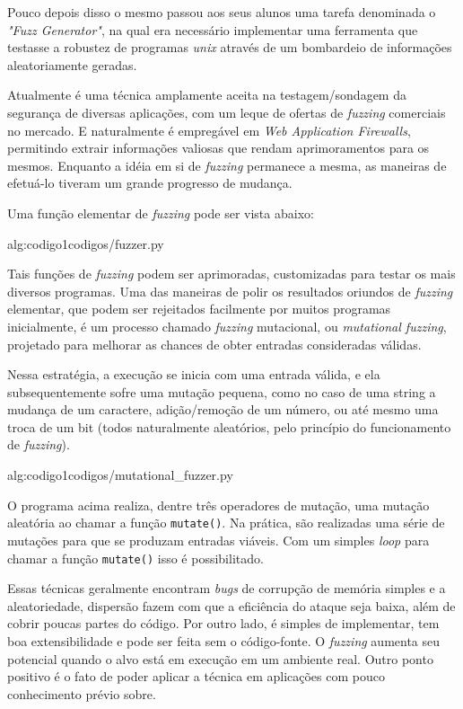 Pouco depois disso o mesmo passou aos seus alunos uma tarefa denominada o \textit{"Fuzz Generator"}, na qual era necessário implementar uma ferramenta que testasse a robustez de programas \textit{unix} através de um bombardeio de informações aleatoriamente geradas.

Atualmente é uma técnica amplamente aceita na testagem/sondagem da segurança de diversas aplicações, com um leque de ofertas de \textit{fuzzing} comerciais no mercado. E naturalmente é empregável em \textit{Web Application Firewalls}, permitindo extrair informações valiosas que rendam aprimoramentos para os mesmos. Enquanto a idéia em si de \textit{fuzzing} permanece a mesma, as maneiras de efetuá-lo tiveram um grande progresso de mudança.


Uma função elementar de \textit{fuzzing} pode ser vista abaixo:

 {alg:codigo1}{codigos/fuzzer.py}

\bigskip
Tais funções de \textit{fuzzing} podem ser aprimoradas, customizadas para testar os mais diversos programas. Uma das maneiras de polir os resultados oriundos de \textit{fuzzing} elementar, que podem ser rejeitados facilmente por muitos programas inicialmente, é um processo chamado \textit{fuzzing} mutacional, ou \textit{mutational fuzzing}, projetado para melhorar as chances de obter entradas consideradas válidas.

Nessa estratégia, a execução se inicia com uma entrada válida, e ela subsequentemente sofre uma mutação pequena, como no caso de uma string a mudança de um caractere, adição/remoção de um número, ou até mesmo uma troca de um bit (todos naturalmente aleatórios, pelo princípio do funcionamento de \textit{fuzzing}).

 {alg:codigo1}{codigos/mutational_fuzzer.py}

\bigskip
O programa acima realiza, dentre três operadores de mutação, uma mutação aleatória ao chamar a função \verb+mutate()+. Na prática, são realizadas uma série de mutações para que se produzam entradas viáveis. Com um simples \textit{loop} para chamar a função \verb+mutate()+ isso é possibilitado.

Essas técnicas geralmente encontram \textit{bugs} de corrupção de memória simples e a aleatoriedade, dispersão fazem com que a eficiência do ataque seja baixa, além de cobrir poucas partes do código. Por outro lado, é simples de implementar, tem boa extensibilidade e pode ser feita sem o código-fonte. O \textit{fuzzing} aumenta seu potencial quando o alvo está em execução em um ambiente real. Outro ponto positivo é o fato de poder aplicar a técnica em aplicações com pouco conhecimento prévio sobre.

